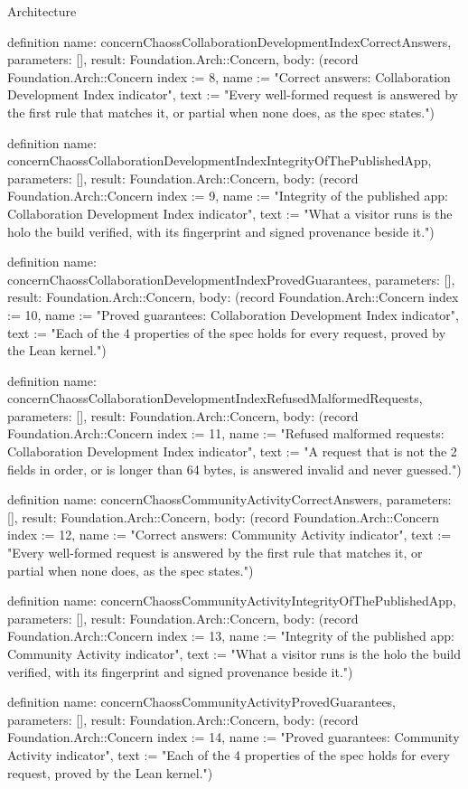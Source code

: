 \begin{lexlean}{Architecture}
\begin{semanticmodule}
definition{
  name: concernChaossCollaborationDevelopmentIndexCorrectAnswers,
  parameters: [],
  result: Foundation.Arch::Concern,
  body: (record Foundation.Arch::Concern {index := 8, name := "Correct answers: Collaboration Development Index indicator", text := "Every well-formed request is answered by the first rule that matches it, or partial when none does, as the spec states."})
}

definition{
  name: concernChaossCollaborationDevelopmentIndexIntegrityOfThePublishedApp,
  parameters: [],
  result: Foundation.Arch::Concern,
  body: (record Foundation.Arch::Concern {index := 9, name := "Integrity of the published app: Collaboration Development Index indicator", text := "What a visitor runs is the holo the build verified, with its fingerprint and signed provenance beside it."})
}

definition{
  name: concernChaossCollaborationDevelopmentIndexProvedGuarantees,
  parameters: [],
  result: Foundation.Arch::Concern,
  body: (record Foundation.Arch::Concern {index := 10, name := "Proved guarantees: Collaboration Development Index indicator", text := "Each of the 4 properties of the spec holds for every request, proved by the Lean kernel."})
}

definition{
  name: concernChaossCollaborationDevelopmentIndexRefusedMalformedRequests,
  parameters: [],
  result: Foundation.Arch::Concern,
  body: (record Foundation.Arch::Concern {index := 11, name := "Refused malformed requests: Collaboration Development Index indicator", text := "A request that is not the 2 fields in order, or is longer than 64 bytes, is answered invalid and never guessed."})
}

definition{
  name: concernChaossCommunityActivityCorrectAnswers,
  parameters: [],
  result: Foundation.Arch::Concern,
  body: (record Foundation.Arch::Concern {index := 12, name := "Correct answers: Community Activity indicator", text := "Every well-formed request is answered by the first rule that matches it, or partial when none does, as the spec states."})
}

definition{
  name: concernChaossCommunityActivityIntegrityOfThePublishedApp,
  parameters: [],
  result: Foundation.Arch::Concern,
  body: (record Foundation.Arch::Concern {index := 13, name := "Integrity of the published app: Community Activity indicator", text := "What a visitor runs is the holo the build verified, with its fingerprint and signed provenance beside it."})
}

definition{
  name: concernChaossCommunityActivityProvedGuarantees,
  parameters: [],
  result: Foundation.Arch::Concern,
  body: (record Foundation.Arch::Concern {index := 14, name := "Proved guarantees: Community Activity indicator", text := "Each of the 4 properties of the spec holds for every request, proved by the Lean kernel."})
}


\end{semanticmodule}
\end{lexlean}
